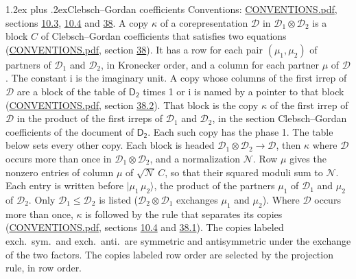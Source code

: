 \documentclass[10pt,a4paper]{article}
\makeatletter
\renewcommand\section{\@startsection{section}{1}{\z@}{-3ex plus -1ex minus -.2ex}%
  {1.2ex plus .2ex}{\normalfont\large\sffamily\bfseries\color{parttitle}}}
\numberwithin{equation}{section}
\newcommand{\grp}[1]{\mathsf{#1}}
\newcommand{\iunit}{\mathrm{i}}
\newcommand{\irrprod}{\otimes}
\newcommand{\mult}{\kappa}
\newcommand{\intx}{\mu}
\newcommand{\cgnorm}{\mathcal{N}}
\newcommand{\prodket}[2]{\lvert {#1}\,{#2}\rangle}
\makeatother
\begin{document}
\section{Clebsch--Gordan coefficients}\label{s:clebsch_gordan}
Conventions: \href{../../CONVENTIONS.pdf}{CONVENTIONS.pdf}, sections \href{../../../rotation/CONVENTIONS.pdf\#conv.10.3}{10.3}, \href{../../../rotation/CONVENTIONS.pdf\#conv.10.4}{10.4} and \href{../../CONVENTIONS.pdf\#conv.38}{38}.
\leavevmode\label{n:index.copy}\label{n:matrix.cg.stored}A copy $\mult$ of a corepresentation $\mathcal{D}$ in $\mathcal{D}_1\irrprod\mathcal{D}_2$ is a block $C$ of Clebsch--Gordan coefficients that satisfies two equations (\href{../../CONVENTIONS.pdf}{CONVENTIONS.pdf}, section \href{../../CONVENTIONS.pdf\#conv.38}{38}). \label{n:index.cg}It has a row for each pair $(\intx_1, \intx_2)$ of partners of $\mathcal{D}_1$ and $\mathcal{D}_2$, in Kronecker order, and a column for each partner $\intx$ of $\mathcal{D}$.
The constant $\iunit$ is the imaginary unit.
A copy whose columns of the first irrep of $\mathcal{D}$ are a block of the table of $\grp{D_{2}}$ times 1 or $\iunit$ is named by a pointer to that block (\href{../../CONVENTIONS.pdf}{CONVENTIONS.pdf}, section \href{../../CONVENTIONS.pdf\#conv.38.2}{38.2}). That block is the copy $\mult$ of the first irrep of $\mathcal{D}$ in the product of the first irreps of $\mathcal{D}_1$ and $\mathcal{D}_2$, in the section Clebsch--Gordan coefficients of the document of \href{../../../rotation/data/pdf/D2.pdf}{$\grp{D_{2}}$}. Each such copy has the phase 1. The table below sets every other copy.
Each block is headed $\mathcal{D}_1\irrprod\mathcal{D}_2\to\mathcal{D}$, then $\mult$ where $\mathcal{D}$ occurs more than once in $\mathcal{D}_1\irrprod\mathcal{D}_2$, and a normalization $\cgnorm$. Row $\intx$ gives the nonzero entries of column $\intx$ of $\sqrt{\cgnorm}\,C$, so that their squared moduli sum to $\cgnorm$. \label{n:vector.ket.product}Each entry is written before $\prodket{\intx_1}{\intx_2}$, the product of the partners $\intx_1$ of $\mathcal{D}_1$ and $\intx_2$ of $\mathcal{D}_2$. Only $\mathcal{D}_1 \le \mathcal{D}_2$ is listed ($\mathcal{D}_2\irrprod\mathcal{D}_1$ exchanges $\intx_1$ and $\intx_2$).
Where $\mathcal{D}$ occurs more than once, $\mult$ is followed by the rule that separates its copies (\href{../../CONVENTIONS.pdf}{CONVENTIONS.pdf}, sections \href{../../../rotation/CONVENTIONS.pdf\#conv.10.4}{10.4} and \href{../../CONVENTIONS.pdf\#conv.38.1}{38.1}). \label{n:abbreviation.exchange}The copies labeled exch.\ sym.\ and exch.\ anti.\ are symmetric and antisymmetric under the exchange of the two factors. The copies labeled row order are selected by the projection rule, in row order.
\end{document}
